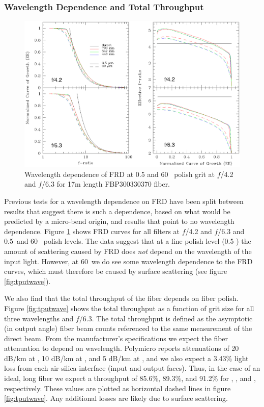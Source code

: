\subsubsection{Wavelength Dependence and Total Throughput}
\label{FRD:sec:wavelength}
\begin{figure}[ht]
  \centering
  \includegraphics[width=\textwidth, trim=0 2.6in 0 0, clip=true]{FRD/figs/filters.eps}
  \caption[Dependence of FRD on wavelength]{\fixspacing\label{fig:wave}
    Wavelength dependence of FRD at 0.5 and 60 \mum\ polish grit at $f$/4.2
    and $f$/6.3 for 17m length FBP300330370 fiber.}
\end{figure}

Previous tests for a wavelength dependence on FRD have been split
between results that suggest there is such a
dependence\cite{Carrasco,Gloge72}, based on what would be predicted by
a micro-bend origin, and results that point to no wavelength
dependence\cite{Mab_04, Schmoll_03}. Figure \ref{fig:wave} shows FRD
curves for all filters at $f$/4.2 and $f$/6.3 and 0.5\mum\ and 60
\mum\ polish levels. The data suggest that at a fine polish level (0.5
\mum) the amount of scattering caused by FRD does {\it not} depend on
the wavelength of the input light. However, at 60\mum\ we do see some
wavelength dependence to the FRD curves, which  must therefore be
caused by surface scattering (see figure \ref{fig:tputwave}).

We also find that the total throughput of the fiber depends on
fiber polish. Figure \ref{fig:tputwave} shows the
total throughput as a function of grit size for all three wavelengths
and $f$/6.3. The total throughput is defined as the asymptotic (in output
 angle) fiber beam counts referenced to the same measurement of the direct
 beam. From the manufacturer's specifications
we expect the fiber attenuation to depend on wavelength. Polymicro
reports attenuations of 20 dB/km at \filtB, 10 dB/km at \filty, and 5
dB/km at \filtI, and we also expect a 3.43\% light loss from each
air-silica interface (input and output faces). Thus, in the case of an
ideal,  long fiber we expect a throughput of 85.6\%,
89.3\%, and 91.2\% for \filtB, \filty, and \filtI, respectively. These
values are plotted as horizontal dashed lines in figure
\ref{fig:tputwave}. Any additional losses are likely due to surface
scattering.

